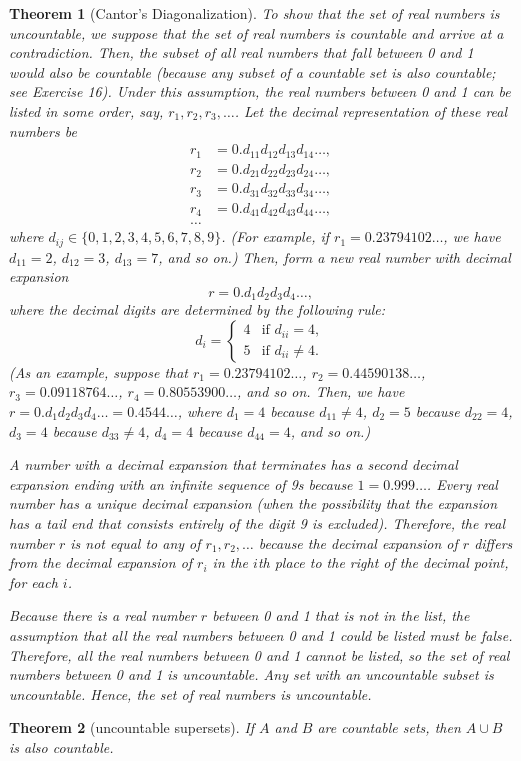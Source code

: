 \documentclass[letterpaper,10pt]{article}
\theoremstyle{plain}
\newtheorem{thm}{Theorem}[section]
\theoremstyle{definition}
\theoremstyle{remark}
\begin{document}
\begin{thm}[Cantor's Diagonalization]

To show that the set of real numbers is uncountable, we suppose that the set of real numbers is countable and arrive at a contradiction. Then, the subset of all real numbers that fall between 0 and 1 would also be countable (because any subset of a countable set is also countable; see Exercise 16). Under this assumption, the real numbers between 0 and 1 can be listed in some order, say, $r_1, r_2, r_3, \ldots$. Let the decimal representation of these real numbers be
\[
\begin{aligned}
    r_1 &= 0.d_{11}d_{12}d_{13}d_{14}\ldots, \\
    r_2 &= 0.d_{21}d_{22}d_{23}d_{24}\ldots, \\
    r_3 &= 0.d_{31}d_{32}d_{33}d_{34}\ldots, \\
    r_4 &= 0.d_{41}d_{42}d_{43}d_{44}\ldots, \\
    \ldots
\end{aligned}
\]
where $d_{ij} \in \{0, 1, 2, 3, 4, 5, 6, 7, 8, 9\}$. (For example, if $r_1 = 0.23794102\ldots$, we have $d_{11} = 2$, $d_{12} = 3$, $d_{13} = 7$, and so on.) Then, form a new real number with decimal expansion
\[
r = 0.d_1d_2d_3d_4\ldots,
\]
where the decimal digits are determined by the following rule:
\[
d_i =
\begin{cases}
    4 & \text{if } d_{ii} = 4, \\
    5 & \text{if } d_{ii} \neq 4.
\end{cases}
\]
(As an example, suppose that $r_1 = 0.23794102\ldots$, $r_2 = 0.44590138\ldots$, $r_3 = 0.09118764\ldots$, $r_4 = 0.80553900\ldots$, and so on. Then, we have $r = 0.d_1d_2d_3d_4\ldots = 0.4544\ldots$, where $d_1 = 4$ because $d_{11} \neq 4$, $d_2 = 5$ because $d_{22} = 4$, $d_3 = 4$ because $d_{33} \neq 4$, $d_4 = 4$ because $d_{44} = 4$, and so on.)

A number with a decimal expansion that terminates has a second decimal expansion ending with an infinite sequence of 9s because $1 = 0.999\ldots$. Every real number has a unique decimal expansion (when the possibility that the expansion has a tail end that consists entirely of the digit 9 is excluded). Therefore, the real number $r$ is not equal to any of $r_1, r_2, \ldots$ because the decimal expansion of $r$ differs from the decimal expansion of $r_i$ in the $i$th place to the right of the decimal point, for each $i$.

Because there is a real number $r$ between 0 and 1 that is not in the list, the assumption that all the real numbers between 0 and 1 could be listed must be false. Therefore, all the real numbers between 0 and 1 cannot be listed, so the set of real numbers between 0 and 1 is uncountable. Any set with an uncountable subset is uncountable. Hence, the set of real numbers is uncountable.
\end{thm}
\begin{thm}[uncountable supersets]
If $A$ and $B$ are countable sets, then $A \cup B$ is also countable.

\end{thm}
\end{document}
